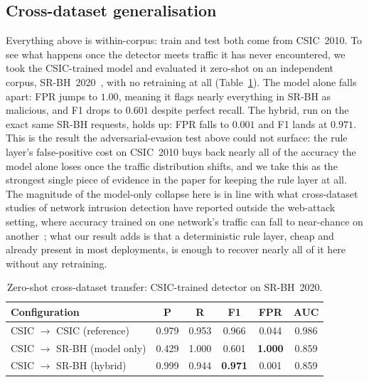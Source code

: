 \documentclass[conference]{IEEEtran}
\begin{document}
\subsection{Cross-dataset generalisation}
\label{sec:crossdataset}
Everything above is within-corpus: train and test both come from
CSIC~2010. To see what happens once the detector meets traffic it has
never encountered, we took the CSIC-trained model and evaluated it
zero-shot on an independent corpus, SR-BH~2020~\cite{srbh2020}, with no
retraining at all (Table~\ref{tab:crossdataset}). The model alone falls
apart: FPR jumps to $1.00$, meaning it flags nearly everything in SR-BH
as malicious, and F1 drops to $0.601$ despite perfect recall. The
hybrid, run on the exact same SR-BH requests, holds up: FPR falls to
$0.001$ and F1 lands at $0.971$. This is the result the
adversarial-evasion test above could not surface: the rule layer's
false-positive cost on CSIC~2010 buys back nearly all of the accuracy
the model alone loses once the traffic distribution shifts, and we take
this as the strongest single piece of evidence in the paper for keeping
the rule layer at all. The magnitude of the model-only collapse here is
in line with what cross-dataset studies of network intrusion detection
have reported outside the web-attack setting, where accuracy trained on
one network's traffic can fall to near-chance on
another~\cite{cantone2024crossdataset,venkatesan2026crossdataset}; what
our result adds is that a deterministic rule layer, cheap and already
present in most deployments, is enough to recover nearly all of it here
without any retraining.

\begin{table}[t]
\centering
\caption{Zero-shot cross-dataset transfer: CSIC-trained detector on SR-BH~2020.}
\label{tab:crossdataset}
\begin{tabular}{@{}lccccc@{}}
\toprule
Configuration & P & R & F1 & FPR & AUC \\
\midrule
CSIC $\to$ CSIC (reference) & 0.979 & 0.953 & 0.966 & 0.044 & 0.986 \\
CSIC $\to$ SR-BH (model only) & 0.429 & 1.000 & 0.601 & \textbf{1.000} & 0.859 \\
CSIC $\to$ SR-BH (hybrid) & 0.999 & 0.944 & \textbf{0.971} & 0.001 & 0.859 \\
\bottomrule
\end{tabular}
\end{table}
\end{document}
